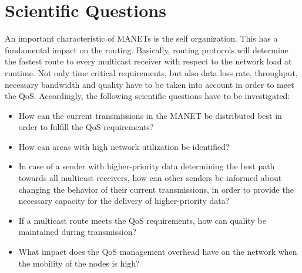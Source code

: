 \documentclass[runningheads]{llncs}
\newcommand{\MANET}{MANET}
\newcommand{\QOS}{QoS}
\begin{document}
	\section{Scientific Questions}
	An important characteristic of \MANET{s} is the self organization. This has a fundamental impact on the routing. Basically, routing protocols will determine the fastest route to every multicast receiver with respect to the network load at runtime. Not only time critical requirements, but also data loss rate, throughput, necessary bandwidth and quality have to be taken into account in order to meet the \QOS{}. Accordingly, the following scientific questions have to be investigated:
	\begin{itemize}
		\item How can the current transmissions in the \MANET{} be distributed best in order to fulfill the \QOS{} requirements? 
		\item How can areas with high network utilization be identified?
		\item In case of a sender with higher-priority data determining the best path towards all multicast receivers, how can other senders be informed about changing the behavior of their current transmissions, in order to provide the necessary capacity for the delivery of higher-priority data?
		\item If a multicast route meets the \QOS{} requirements, how can quality be maintained during transmission?
		\item What impact does the \QOS{} management overhead have on the network when the mobility of the nodes is high?
	\end{itemize}
\end{document}
